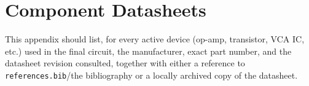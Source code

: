 \chapter{Component Datasheets}
\label{app:datasheets}

This appendix should list, for every active device (op-amp, transistor, VCA IC, etc.) used in the final circuit, the manufacturer, exact part number, and the datasheet revision consulted, together with either a reference to \texttt{references.bib}/the bibliography or a locally archived copy of the datasheet.


